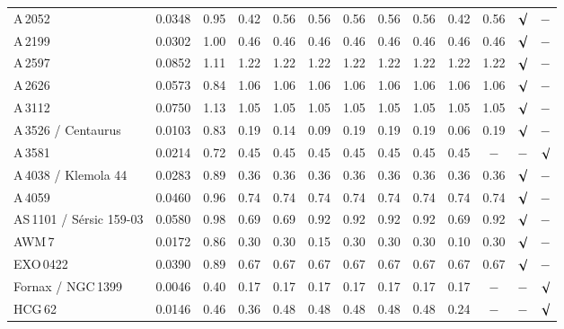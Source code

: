 \documentclass{aa}
\begin{document}
\begin{table}[!]
\begin{centering}
\begin{tabular}{l c c c c c c c c c c c c}
A\,2052 &     0.0348 & 0.95 & 0.42 & 0.56 & 0.56 & 0.56 & 0.56 & 0.56 & 0.42 & 0.56 & $\surd$ & $-$ \\

A\,2199 &     0.0302 & 1.00 & 0.46 & 0.46 & 0.46 & 0.46 & 0.46 & 0.46 & 0.46 & 0.46 & $\surd$ & $-$ \\

A\,2597 &    0.0852 & 1.11 & 1.22 & 1.22 & 1.22 & 1.22 & 1.22 & 1.22 & 1.22 & 1.22 & $\surd$ & $-$ \\

A\,2626 &     0.0573 & 0.84 & 1.06 & 1.06 & 1.06 & 1.06 & 1.06 & 1.06 & 1.06 & 1.06 & $\surd$ & $-$ \\

A\,3112 &     0.0750 & 1.13 & 1.05 & 1.05 & 1.05 & 1.05 & 1.05 & 1.05 & 1.05 & 1.05 & $\surd$ & $-$ \\

A\,3526 / Centaurus   & 0.0103 & 0.83 & 0.19 & 0.14 & 0.09 & 0.19 & 0.19 & 0.19 & 0.06 & 0.19 & $\surd$ & $-$ \\

A\,3581 &    0.0214 & 0.72 & 0.45 & 0.45 & 0.45 & 0.45 & 0.45 & 0.45 & 0.45 & $-$ & $-$ & $\surd$ \\

A\,4038 / Klemola 44  & 0.0283 & 0.89 & 0.36 & 0.36 & 0.36 & 0.36 & 0.36 & 0.36 & 0.36 & 0.36 & $\surd$ & $-$ \\

A\,4059 &    0.0460 & 0.96 & 0.74 & 0.74 & 0.74 & 0.74 & 0.74 & 0.74 & 0.74 & 0.74 & $\surd$ & $-$ \\

AS\,1101 / S\'ersic 159-03 &    0.0580 & 0.98 & 0.69 & 0.69 & 0.92 & 0.92 & 0.92 & 0.92 & 0.69 & 0.92 & $\surd$ & $-$ \\

AWM\,7 &   0.0172 & 0.86 & 0.30 & 0.30 & 0.15 & 0.30 & 0.30 & 0.30 & 0.10 & 0.30 & $\surd$ & $-$ \\

EXO\,0422 &    0.0390 & 0.89 & 0.67 & 0.67 & 0.67 & 0.67 & 0.67 & 0.67 & 0.67 & 0.67 & $\surd$ & $-$ \\

Fornax / NGC\,1399 &    0.0046 & 0.40 & 0.17 & 0.17 & 0.17 & 0.17 & 0.17 & 0.17 & 0.17 & $-$ & $-$ & $\surd$ \\

HCG\,62 &    0.0146 & 0.46 & 0.36 & 0.48 & 0.48 & 0.48 & 0.48 & 0.48 & 0.24 & $-$ & $-$ & $\surd$ \\


\end{tabular}
\end{centering}
\end{table}
\end{document}
